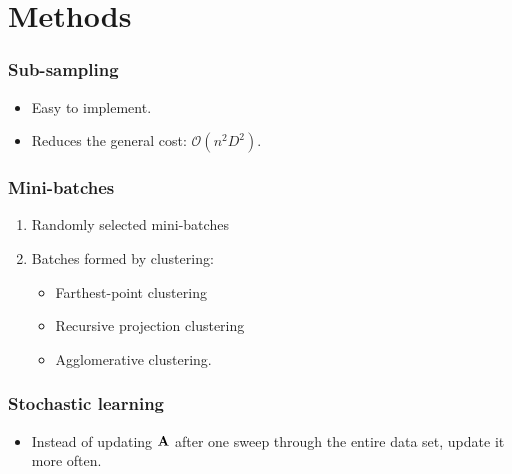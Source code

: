 \documentclass{beamer}
\begin{document}
  \section{Methods}
  \begin{frame}
  	\frametitle{Sub-sampling}
  	\begin{itemize}
  		\item Easy to implement.
  		\item Reduces the general cost: $\mathcal{O}(n^2D^2)$.
  	\end{itemize}
  \end{frame}
  
  \begin{frame}
	  \frametitle{Mini-batches}
	  \begin{enumerate}
		  \item Randomly selected mini-batches
		  \item Batches formed by clustering:
		  	\begin{itemize}
			  	\item Farthest-point clustering
			  	\item Recursive projection clustering
			  	\item Agglomerative clustering.
		  	\end{itemize}
	  \end{enumerate}
  \end{frame}
  
  \begin{frame}
	  \frametitle{Stochastic learning}
	  \begin{itemize}
		  \item Instead of updating $\mathbf{A}$ after one sweep through the entire data set, update it more often.
	  \end{itemize}
  \end{frame}
  
\end{document}
